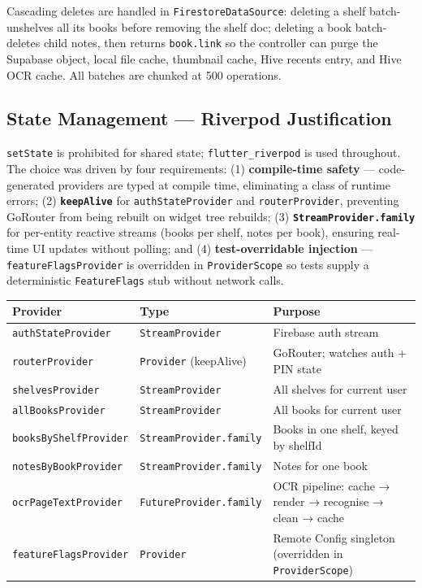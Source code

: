 \documentclass[11pt,a4paper]{article}
\begin{document}
Cascading deletes are handled in \texttt{FirestoreDataSource}: deleting a shelf
batch-unshelves all its books before removing the shelf doc; deleting a book
batch-deletes child notes, then returns \texttt{book.link} so the controller can
purge the Supabase object, local file cache, thumbnail cache, Hive recents entry, and
Hive OCR cache. All batches are chunked at 500 operations.

\subsection{State Management — Riverpod Justification}

\texttt{setState} is prohibited for shared state; \texttt{flutter\_riverpod} is used
throughout. The choice was driven by four requirements: (1) \textbf{compile-time safety}
— code-generated providers are typed at compile time, eliminating a class of runtime
errors; (2) \textbf{\texttt{keepAlive}} for \texttt{authStateProvider} and
\texttt{routerProvider}, preventing GoRouter from being rebuilt on widget tree rebuilds;
(3) \textbf{\texttt{StreamProvider.family}} for per-entity reactive streams (books per
shelf, notes per book), ensuring real-time UI updates without polling; and (4)
\textbf{test-overridable injection} — \texttt{featureFlagsProvider} is overridden in
\texttt{ProviderScope} so tests supply a deterministic \texttt{FeatureFlags} stub
without network calls.

\vspace{4pt}
\begin{tabularx}{\textwidth}{@{}L{4.4cm} L{3.2cm} L{6.1cm}@{}}
  \toprule
  \textbf{Provider} & \textbf{Type} & \textbf{Purpose} \\
  \midrule
  \texttt{authStateProvider} & \texttt{StreamProvider} & Firebase auth stream \\
  \texttt{routerProvider} & \texttt{Provider} (keepAlive) & GoRouter; watches auth + PIN state \\
  \texttt{shelvesProvider} & \texttt{StreamProvider} & All shelves for current user \\
  \texttt{allBooksProvider} & \texttt{StreamProvider} & All books for current user \\
  \texttt{booksByShelfProvider} & \texttt{StreamProvider.family} & Books in one shelf, keyed by shelfId \\
  \texttt{notesByBookProvider} & \texttt{StreamProvider.family} & Notes for one book \\
  \texttt{ocrPageTextProvider} & \texttt{FutureProvider.family} & OCR pipeline: cache → render → recognise → clean → cache \\
  \texttt{featureFlagsProvider} & \texttt{Provider} & Remote Config singleton (overridden in \texttt{ProviderScope}) \\
  \bottomrule
\end{tabularx}
\end{document}
